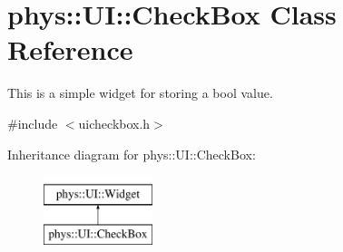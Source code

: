 \hypertarget{classphys_1_1UI_1_1CheckBox}{
\section{phys::UI::CheckBox Class Reference}
\label{dd/d10/classphys_1_1UI_1_1CheckBox}
}


This is a simple widget for storing a bool value.  




{\ttfamily \#include $<$uicheckbox.h$>$}

Inheritance diagram for phys::UI::CheckBox:\begin{figure}[H]
\begin{center}
\leavevmode
\includegraphics[height=2.000000cm]{dd/d10/classphys_1_1UI_1_1CheckBox}
\end{center}
\end{figure}
